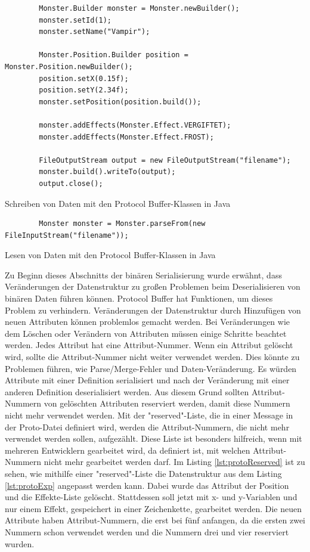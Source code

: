 \begin{listing}[htp]
    \begin{verbatim} 
        Monster.Builder monster = Monster.newBuilder();
        monster.setId(1);
        monster.setName("Vampir");

        Monster.Position.Builder position = Monster.Position.newBuilder();
        position.setX(0.15f);
        position.setY(2.34f);
        monster.setPosition(position.build());

        monster.addEffects(Monster.Effect.VERGIFTET);
        monster.addEffects(Monster.Effect.FROST);

        FileOutputStream output = new FileOutputStream("filename");
        monster.build().writeTo(output);
        output.close();
    \end{verbatim}
    \caption{Schreiben von Daten mit den Protocol Buffer-Klassen in Java}
    \label{lst:protobufJavaWrite}
\end{listing}

\begin{listing}[htp]
    \begin{verbatim} 
        Monster monster = Monster.parseFrom(new FileInputStream("filename"));
    \end{verbatim}
    \caption{Lesen von Daten mit den Protocol Buffer-Klassen in Java}
    \label{lst:protobufJavaRead}
\end{listing}

Zu Beginn dieses Abschnitts der binären Serialisierung wurde erwähnt, dass Veränderungen der Datenstruktur zu großen Problemen beim Deserialisieren von binären Daten führen können. Protocol Buffer hat Funktionen, um dieses Problem zu verhindern. Veränderungen der Datenstruktur durch Hinzufügen von neuen Attributen können problemlos gemacht werden. Bei Veränderungen wie dem Löschen oder Verändern von Attributen müssen einige Schritte beachtet werden. Jedes Attribut hat eine Attribut-Nummer. Wenn ein Attribut gelöscht wird, sollte die Attribut-Nummer nicht weiter verwendet werden. Dies könnte zu Problemen führen, wie Parse/Merge-Fehler und Daten-Veränderung. Es würden Attribute mit einer Definition serialisiert und nach der Veränderung mit einer anderen Definition deserialisiert werden. Aus diesem Grund sollten Attribut-Nummern von gelöschten Attributen reserviert werden, damit diese Nummern nicht mehr verwendet werden. Mit der "reserved"-Liste, die in einer Message in der Proto-Datei definiert wird, werden die Attribut-Nummern, die nicht mehr verwendet werden sollen, aufgezählt. Diese Liste ist besonders hilfreich, wenn mit mehreren Entwicklern gearbeitet wird,
da definiert ist, mit welchen Attribut-Nummern nicht mehr gearbeitet werden darf. Im Listing \ref{lst:protoReserved} ist zu sehen, wie mithilfe einer "reserved"-Liste die Datenstruktur aus dem Listing \ref{lst:protoExp} angepasst werden kann. Dabei wurde das Attribut der Position und die Effekte-Liste gelöscht. Stattdessen soll jetzt mit x- und y-Variablen und nur einem Effekt, gespeichert in einer Zeichenkette, gearbeitet werden. Die neuen Attribute haben Attribut-Nummern, die erst bei fünf anfangen, da die ersten zwei Nummern schon verwendet werden und die Nummern drei und vier reserviert wurden.\cite{protobufLanguageGuide}

